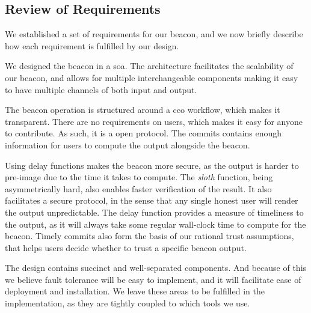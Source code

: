 \subsection{Review of Requirements}
We established a set of requirements for our beacon, and we now briefly describe how each requirement is fulfilled by our design.







We designed the beacon in a \gls{soa}. The architecture facilitates the scalability of our beacon, and allows for multiple interchangeable components making it easy to have multiple channels of both input and output.

The beacon operation is structured around a \acrshort{cco} workflow, which makes it transparent.
There are no requirements on users, which makes it easy for anyone to contribute. As such, it is a open protocol.
The commits contains enough information for users to compute the output alongside the beacon.

Using delay functions makes the beacon more secure, as the output is harder to pre-image due to the time it takes to compute.
The \emph{sloth} function, being asymmetrically hard, also enables faster verification of the result.
It also facilitates a secure protocol, in the sense that any single honest user will render the output unpredictable.
The delay function provides a measure of timeliness to the output, as it will always take some regular wall-clock time to compute for the beacon.
Timely commits also form the basis of our rational trust assumptions, that helps users decide whether to trust a specific beacon output.

The design contains succinct and well-separated components.
And because of this we believe fault tolerance will be easy to implement, and it will facilitate ease of deployment and installation.
We leave these areas to be fulfilled in the implementation, as they are tightly coupled to which tools we use.

